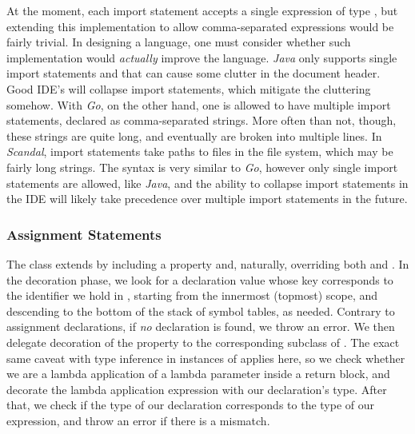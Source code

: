At the moment, each import statement accepts a single expression of type , but extending this implementation to allow comma-separated expressions would be fairly trivial. In designing a language, one must consider whether such implementation would \emph{actually} improve the language. \emph{Java} only supports single import statements and that can cause some clutter in the document header. Good IDE's will collapse import statements, which mitigate the cluttering somehow. With \emph{Go}, on the other hand, one is allowed to have multiple import statements, declared as comma-separated strings. More often than not, though, these strings are quite long, and eventually are broken into multiple lines. In \emph{Scandal}, import statements take paths to files in the file system, which may be fairly long strings. The syntax is very similar to \emph{Go}, however only single import statements are allowed, like \emph{Java}, and the ability to collapse import statements in the IDE will likely take precedence over multiple import statements in the future.

\subsubsection{Assignment Statements}

The  class extends  by including a  property and, naturally, overriding both  and . In the decoration phase, we look for a declaration value whose key corresponds to the identifier we hold in , starting from the innermost (topmost) scope, and descending to the bottom of the stack of symbol tables, as needed. Contrary to assignment declarations, if \emph{no} declaration is found, we throw an error. We then delegate decoration of the  property to the corresponding subclass of . The exact same caveat with type inference in instances of  applies here, so we check whether we are a lambda application of a lambda parameter inside a return block, and decorate the lambda application expression with our declaration's type. After that, we check if the type of our declaration corresponds to the type of our expression, and throw an error if there is a mismatch.

